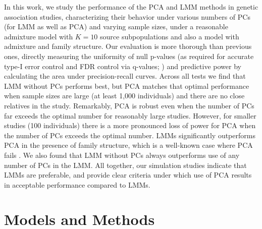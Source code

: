 \documentclass[11pt]{article}
\begin{document}
In this work, we study the performance of the PCA and LMM methods in genetic association studies, characterizing their behavior under various numbers of PCs (for LMM as well as PCA) and varying sample sizes, under a reasonable admixture model with $K = 10$ source subpopulations and also a model with admixture and family structure.
Our evaluation is more thorough than previous ones, directly measuring the uniformity of null p-values (as required for accurate type-I error control and FDR control via q-values; \cite{storey_positive_2003, storey_statistical_2003}) and predictive power by calculating the area under precision-recall curves.
Across all tests we find that LMM without PCs performs best, but PCA matches that optimal performance when sample sizes are large (at least 1,000 individuals) and there are no close relatives in the study.
Remarkably, PCA is robust even when the number of PCs far exceeds the optimal number for reasonably large studies.
However, for smaller studies (100 individuals) there is a more pronounced loss of power for PCA when the number of PCs exceeds the optimal number.
LMMs significantly outperforms PCA in the presence of family structure, which is a well-known case where PCA fails \citep{patterson_population_2006, price_new_2010}.
We also found that LMM without PCs always outperforms use of any number of PCs in the LMM.
All together, our simulation studies indicate that LMMs are preferable, and provide clear criteria under which use of PCA results in acceptable performance compared to LMMs.


\section{Models and Methods}
\end{document}
